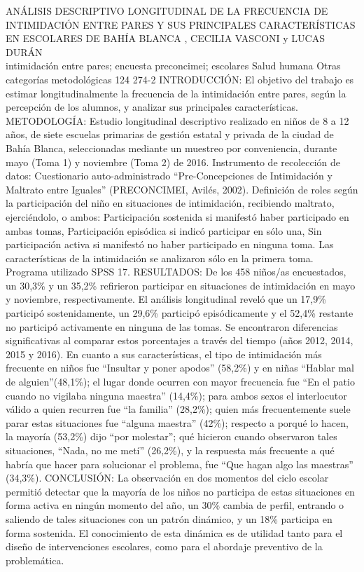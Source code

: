 \A
{ANÁLISIS DESCRIPTIVO LONGITUDINAL DE LA FRECUENCIA DE INTIMIDACIÓN ENTRE PARES Y SUS PRINCIPALES CARACTERÍSTICAS EN ESCOLARES DE BAHÍA BLANCA}
{, CECILIA VASCONI y LUCAS DURÁN}
{
\\}
{intimidación entre pares; encuesta preconcimei; escolares} 
 {Salud humana} 
 {Otras categorías metodológicas} 
 {124} 
 {274-2}
{INTRODUCCIÓN: El objetivo del trabajo es estimar longitudinalmente la frecuencia de la intimidación entre pares, según la percepción de los alumnos, y analizar sus principales características. METODOLOGÍA: Estudio longitudinal descriptivo realizado en niños de 8 a 12 años, de siete escuelas primarias de gestión estatal y privada de la ciudad de Bahía Blanca, seleccionadas mediante un muestreo por conveniencia, durante mayo (Toma 1) y noviembre (Toma 2) de 2016. Instrumento de recolección de datos: Cuestionario auto-administrado “Pre-Concepciones de Intimidación y Maltrato entre Iguales” (PRECONCIMEI, Avilés, 2002). Definición de roles según la participación del niño en situaciones de intimidación, recibiendo maltrato, ejerciéndolo, o ambos: Participación sostenida si manifestó haber participado en ambas tomas, Participación episódica si indicó participar en sólo una, Sin participación activa si manifestó no haber participado en ninguna toma. Las características de la intimidación se analizaron sólo en la primera toma. Programa utilizado SPSS 17. RESULTADOS: De los 458 niños/as encuestados, un 30,3\% y un 35,2\% refirieron participar en situaciones de intimidación en mayo y noviembre, respectivamente. El análisis longitudinal reveló que un 17,9\% participó sostenidamente, un 29,6\% participó episódicamente y el 52,4\% restante no participó activamente en ninguna de las tomas. Se encontraron diferencias significativas al comparar estos porcentajes a través del tiempo (años 2012, 2014, 2015 y 2016). En cuanto a sus características, el tipo de intimidación más frecuente en niños fue “Insultar y poner apodos” (58,2\%) y en niñas “Hablar mal de alguien”(48,1\%); el lugar donde ocurren con mayor frecuencia fue “En el patio cuando no vigilaba ninguna maestra” (14,4\%); para ambos sexos el interlocutor válido a quien recurren fue “la familia” (28,2\%); quien más frecuentemente suele parar estas situaciones fue “alguna maestra” (42\%); respecto a porqué lo hacen, la mayoría (53,2\%) dijo “por molestar”; qué hicieron cuando observaron tales situaciones, “Nada, no me metí” (26,2\%), y la respuesta más frecuente a qué habría que hacer para solucionar el problema, fue “Que hagan algo las maestras” (34,3\%). CONCLUSIÓN: La observación en dos momentos del ciclo escolar permitió detectar que la mayoría de los niños no participa de estas situaciones en forma activa en ningún momento del año, un 30\% cambia de perfil, entrando o saliendo de tales situaciones con un patrón dinámico, y un 18\% participa en forma sostenida. El conocimiento de esta dinámica es de utilidad tanto para el diseño de intervenciones escolares, como para el abordaje preventivo de la problemática. }
